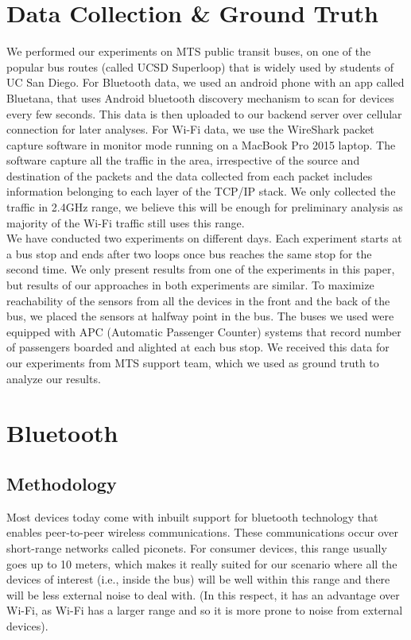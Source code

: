 \section{Data Collection \& Ground Truth}
\label{sec:datacollection}
We performed our experiments on MTS public transit buses, on one of the popular bus routes (called UCSD Superloop) that is widely used by students of UC San Diego. For Bluetooth data, we used an android phone with an app called Bluetana, that uses Android bluetooth discovery mechanism to scan for devices every few seconds. This data is then uploaded to our backend server over cellular connection for later analyses. For Wi-Fi data, we use the WireShark packet capture software in monitor mode running on a MacBook Pro 2015 laptop. The software capture all the traffic in the area, irrespective of the source and destination of the packets and the data collected from each packet includes information belonging to each layer of the TCP/IP stack. We only collected the traffic in 2.4GHz range, we believe this will be enough for preliminary analysis as majority of the Wi-Fi traffic still uses this range. \\


We have conducted two experiments on different days. Each experiment starts at a bus stop and ends after two loops once bus reaches the same stop for the second time. We only present results from one of the experiments in this paper, but results of our approaches in both experiments are similar. To maximize reachability of the sensors from all the devices in the front and the back of the bus, we placed the sensors at halfway point in the bus. The buses we used were equipped with APC (Automatic Passenger Counter) systems that record number of passengers boarded and alighted at each bus stop. We received this data for our experiments from MTS support team, which we used as ground truth to analyze our results. 


\section{Bluetooth}
\label{sec:bluetooth}

\subsection{Methodology}
Most devices today come with inbuilt support for bluetooth technology that enables peer-to-peer wireless communications. These communications occur over short-range networks called piconets. For consumer devices, this range usually goes up to 10 meters, which makes it really suited for our scenario where all the devices of interest (i.e., inside the bus) will be well within this range and there will be less external noise to deal with. (In this respect, it has an advantage over Wi-Fi, as Wi-Fi has a larger range and so it is more prone to  noise from external devices). \\

